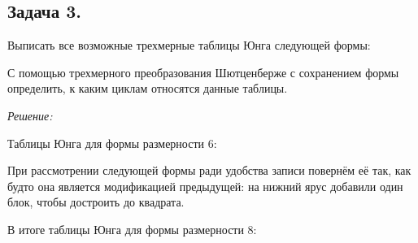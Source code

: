 \newpage

\subsection*{Задача 3.}

Выписать все возможные трехмерные таблицы Юнга следующей формы:
\begin{figure}[H]
\end{figure}

С помощью трехмерного преобразования Шютценберже с сохранением формы определить, к каким циклам относятся данные таблицы.

\noindent\textit{Решение:}

Таблицы Юнга для формы размерности 6:
\begin{figure}[H]
\end{figure}

При рассмотрении следующей формы ради удобства записи повернём её так, как будто она является модификацией предыдущей: на нижний ярус добавили один блок, чтобы достроить до квадрата.

В итоге таблицы Юнга для формы размерности 8:
\begin{figure}[H]
\end{figure}

